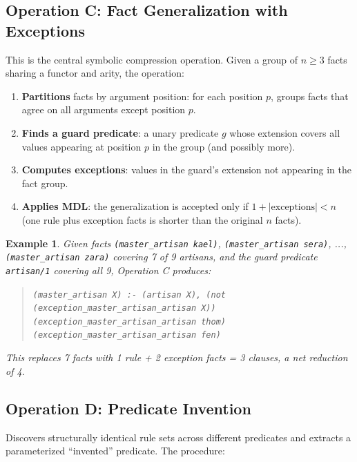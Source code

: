 \documentclass[10pt,conference]{IEEEtran}
\newtheorem{example}[theorem]{Example}
\begin{document}
\subsection{Operation C: Fact Generalization with Exceptions}
\label{sec:opC}

This is the central symbolic compression operation. Given a group of $n \geq 3$ facts sharing a functor and arity, the operation:

\begin{enumerate}
\item \textbf{Partitions} facts by argument position: for each position $p$, groups facts that agree on all arguments except position $p$.
\item \textbf{Finds a guard predicate}: a unary predicate $g$ whose extension covers all values appearing at position $p$ in the group (and possibly more).
\item \textbf{Computes exceptions}: values in the guard's extension not appearing in the fact group.
\item \textbf{Applies MDL}: the generalization is accepted only if $1 + |\text{exceptions}| < n$ (one rule plus exception facts is shorter than the original $n$ facts).
\end{enumerate}

\begin{example}
Given facts \texttt{(master\_artisan kael)}, \texttt{(master\_artisan sera)}, ..., \texttt{(master\_artisan zara)} covering 7 of 9 artisans, and the guard predicate \texttt{artisan/1} covering all 9, Operation C produces:
\begin{quote}
\texttt{(master\_artisan X) :- (artisan X), (not (exception\_master\_artisan\_artisan X))}\\
\texttt{(exception\_master\_artisan\_artisan thom)}\\
\texttt{(exception\_master\_artisan\_artisan fen)}
\end{quote}
This replaces 7 facts with 1 rule + 2 exception facts = 3 clauses, a net reduction of 4.
\end{example}

\subsection{Operation D: Predicate Invention}

Discovers structurally identical rule sets across different predicates and extracts a parameterized ``invented'' predicate. The procedure:
\end{document}
